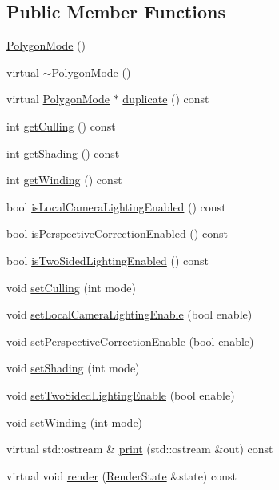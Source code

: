 \subsection*{Public Member Functions}
\begin{CompactItemize}
\item 
\hyperlink{classm3g_1_1PolygonMode_b089ee808cbc4799bb2e92dd4ca554c3}{PolygonMode} ()
\item 
virtual \hyperlink{classm3g_1_1PolygonMode_64ea3958d7ec67fc648707782b2221fe}{$\sim$PolygonMode} ()
\item 
virtual \hyperlink{classm3g_1_1PolygonMode}{PolygonMode} $\ast$ \hyperlink{classm3g_1_1PolygonMode_a302cb097523e044bc03198ec8448c32}{duplicate} () const 
\item 
int \hyperlink{classm3g_1_1PolygonMode_3b0c0325e93774222d828f2612d59b1b}{getCulling} () const 
\item 
int \hyperlink{classm3g_1_1PolygonMode_c09a62f099e07df16a8c21f997b9f6a6}{getShading} () const 
\item 
int \hyperlink{classm3g_1_1PolygonMode_6000aac10def51a7c7f12e1381bce19d}{getWinding} () const 
\item 
bool \hyperlink{classm3g_1_1PolygonMode_b8db417fcee613ac80e84087046930cd}{isLocalCameraLightingEnabled} () const 
\item 
bool \hyperlink{classm3g_1_1PolygonMode_76ec871d6ed45e6e6a8822f5c45c828b}{isPerspectiveCorrectionEnabled} () const 
\item 
bool \hyperlink{classm3g_1_1PolygonMode_e7b9f0464063485b025f11a310bb0b80}{isTwoSidedLightingEnabled} () const 
\item 
void \hyperlink{classm3g_1_1PolygonMode_55b3fc23392376c00748d68bdf44ca60}{setCulling} (int mode)
\item 
void \hyperlink{classm3g_1_1PolygonMode_232d4cff53e6fc4863e144dc61e9465c}{setLocalCameraLightingEnable} (bool enable)
\item 
void \hyperlink{classm3g_1_1PolygonMode_81003e409298c3247ab2fed98a7270e9}{setPerspectiveCorrectionEnable} (bool enable)
\item 
void \hyperlink{classm3g_1_1PolygonMode_ebd2bc289af0e5cbee5ea29cbc55ba5a}{setShading} (int mode)
\item 
void \hyperlink{classm3g_1_1PolygonMode_8687b0d3016a777d32e7ebfa1ffd45aa}{setTwoSidedLightingEnable} (bool enable)
\item 
void \hyperlink{classm3g_1_1PolygonMode_5535581a651835a0da246b5936c2f0b5}{setWinding} (int mode)
\item 
virtual std::ostream \& \hyperlink{classm3g_1_1PolygonMode_6fea17fa1532df3794f8cb39cb4f911f}{print} (std::ostream \&out) const 
\item 
virtual void \hyperlink{classm3g_1_1PolygonMode_8babc8a79b78615da51161e94029eea9}{render} (\hyperlink{structm3g_1_1RenderState}{RenderState} \&state) const 
\end{CompactItemize}
